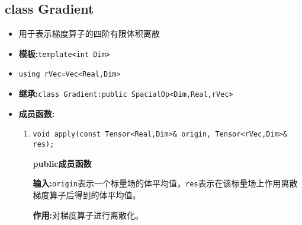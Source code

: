 \documentclass[UTF8]{ctexart}
\theoremstyle{plain}
\theoremstyle{definition}
\theoremstyle{remark}
\begin{document}
\subsection{class Gradient}
\begin{itemize}
    \item 用于表示梯度算子的四阶有限体积离散
    \item \textbf{模板:}\texttt{template<int Dim>}
    \item \texttt{using rVec=Vec<Real,Dim>}
    \item \textbf{继承:}\texttt{class Gradient:public SpacialOp<Dim,Real,rVec>}
    \item \textbf{成员函数:}
    \begin{enumerate}
        \item \texttt{void apply(const Tensor<Real,Dim>\& origin, Tensor<rVec,Dim>\& res);}
        
        \textbf{public成员函数}

        \textbf{输入:}\texttt{origin}表示一个标量场的体平均值，\texttt{res}表示在该标量场上作用离散梯度算子后得到的体平均值。

        \textbf{作用:}对梯度算子进行离散化。
    \end{enumerate}
\end{itemize}
\end{document}
